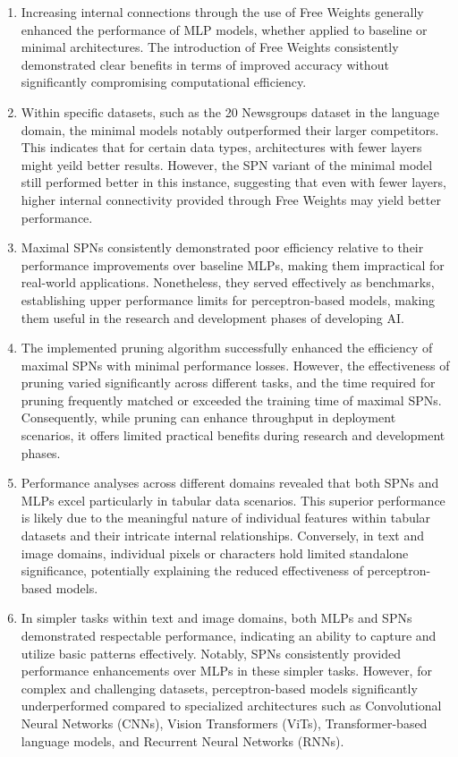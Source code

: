 \begin{enumerate}
    \item Increasing internal connections through the use of Free Weights generally enhanced the performance of MLP models, whether applied to baseline or minimal architectures. The introduction of Free Weights consistently demonstrated clear benefits in terms of improved accuracy without significantly compromising computational efficiency.
    \item Within specific datasets, such as the 20 Newsgroups dataset in the language domain, the minimal models notably outperformed their larger competitors. This indicates that for certain data types, architectures with fewer layers might yeild better results. However, the SPN variant of the minimal model still performed better in this instance, suggesting that even with fewer layers, higher internal connectivity provided through Free Weights may yield better performance.
    \item Maximal SPNs consistently demonstrated poor efficiency relative to their performance improvements over baseline MLPs, making them impractical for real-world applications. Nonetheless, they served effectively as benchmarks, establishing upper performance limits for perceptron-based models, making them useful in the research and development phases of developing AI.
    \item The implemented pruning algorithm successfully enhanced the efficiency of maximal SPNs with minimal performance losses. However, the effectiveness of pruning varied significantly across different tasks, and the time required for pruning frequently matched or exceeded the training time of maximal SPNs. Consequently, while pruning can enhance throughput in deployment scenarios, it offers limited practical benefits during research and development phases.
    \item Performance analyses across different domains revealed that both SPNs and MLPs excel particularly in tabular data scenarios. This superior performance is likely due to the meaningful nature of individual features within tabular datasets and their intricate internal relationships. Conversely, in text and image domains, individual pixels or characters hold limited standalone significance, potentially explaining the reduced effectiveness of perceptron-based models.
    \item In simpler tasks within text and image domains, both MLPs and SPNs demonstrated respectable performance, indicating an ability to capture and utilize basic patterns effectively. Notably, SPNs consistently provided performance enhancements over MLPs in these simpler tasks. However, for complex and challenging datasets, perceptron-based models significantly underperformed compared to specialized architectures such as Convolutional Neural Networks (CNNs)\cite{krizhevsky2012imagenet}, Vision Transformers (ViTs)\cite{dosovitskiy2020image}, Transformer-based language models\cite{vaswani2017attention}, and Recurrent Neural Networks (RNNs)\cite{lipton2015critical}.
\end{enumerate}

